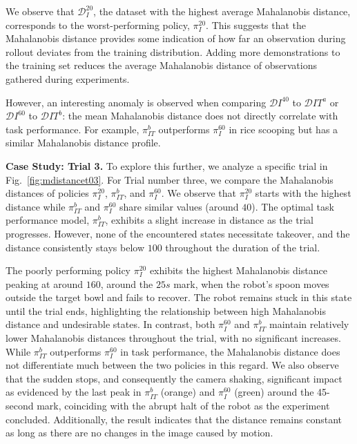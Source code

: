 We observe that $\mathcal{D}_I^{20}$, the dataset with the highest average Mahalanobis distance, corresponds to the worst-performing policy, $\pi_I^{20}$. This suggests that the Mahalanobis distance provides some indication of how far an observation during rollout deviates from the training distribution. Adding more demonstrations to the training set reduces the average Mahalanobis distance of observations gathered during experiments.

However, an interesting anomaly is observed when comparing $\mathcal{D}I^{40}$ to $\mathcal{D}{IT}^a$ or $\mathcal{D}I^{60}$ to $\mathcal{D}{IT}^b$: the mean Mahalanobis distance does not directly correlate with task performance. For example, $\pi_{IT}^b$ outperforms $\pi_I^{60}$ in rice scooping but has a similar Mahalanobis distance profile.

\textbf{Case Study: Trial 3.}
To explore this further, we analyze a specific trial in Fig.~\ref{fig:mdistancet03}. For Trial number three, we compare the Mahalanobis distances of policies $\pi_I^{20}$, $\pi_{IT}^b$, and $\pi_I^{60}$. 
We observe that $\pi_I^{20}$ starts with the highest distance while $\pi_{IT}^b$ and $\pi_I^{60}$ share similar values (around $40$). The optimal task performance model, $\pi_{IT}^b$, exhibits a slight increase in distance as the trial progresses. However, none of the encountered states necessitate takeover, and the distance consistently stays below $100$ throughout the duration of the trial.

The poorly performing policy $\pi_I^{20}$ exhibits the highest Mahalanobis distance peaking at around $160$, around the $25s$ mark, when the robot's spoon moves outside the target bowl and fails to recover. The robot remains stuck in this state until the trial ends, highlighting the relationship between high Mahalanobis distance and undesirable states.
In contrast, both $\pi_I^{60}$ and $\pi_{IT}^b$ maintain relatively lower Mahalanobis distances throughout the trial, with no significant increases. While $\pi_{IT}^b$ outperforms $\pi_I^{60}$ in task performance, the Mahalanobis distance does not differentiate much between the two policies in this regard. We also observe that the sudden stops, and consequently the camera shaking, significant impact as evidenced by the last peak in $\pi_{IT}^b$ (orange) and $\pi_I^{60}$ (green) around the 45-second mark, coinciding with the abrupt halt of the robot as the experiment concluded. Additionally, the result indicates that the distance remains constant as long as there are no changes in the image caused by motion.

